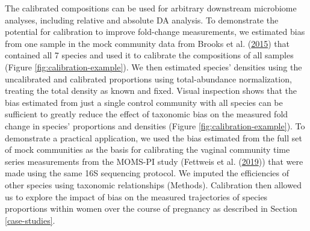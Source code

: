 \documentclass[
]{article}
\begin{document}
The calibrated compositions can be used for arbitrary downstream microbiome analyses, including relative and absolute DA analysis.
To demonstrate the potential for calibration to improve fold-change measurements, we estimated bias from one sample in the mock community data from Brooks et al. (\protect\hyperlink{ref-brooks2015thet}{2015}) that contained all 7 species and used it to calibrate the compositions of all samples (Figure \ref{fig:calibration-example}).
We then estimated species' densities using the uncalibrated and calibrated proportions using total-abundance normalization, treating the total density as known and fixed.
Visual inspection shows that the bias estimated from just a single control community with all species can be sufficient to greatly reduce the effect of taxonomic bias on the measured fold change in species' proportions and densities (Figure \ref{fig:calibration-example}).
To demonstrate a practical application, we used the bias estimated from the full set of mock communities as the basis for calibrating the vaginal community time series measurements from the MOMS-PI study (Fettweis et al. (\protect\hyperlink{ref-fettweis2019thev}{2019})) that were made using the same 16S sequencing protocol.
We imputed the efficiencies of other species using taxonomic relationships (Methods).
Calibration then allowed us to explore the impact of bias on the measured trajectories of species proportions within women over the course of pregnancy as described in Section \ref{case-studies}.
\end{document}
